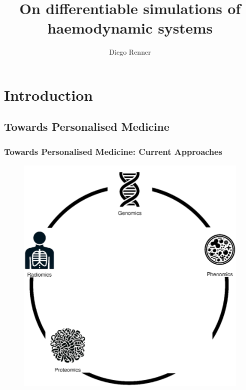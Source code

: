 \documentclass[compress]{beamer}
\title{On differentiable simulations of \\ haemodynamic systems}
\author{Diego Renner}
\begin{document}
\section{Introduction}
\subsection{Towards Personalised Medicine}
\maketitle
\begin{frame}
	\frametitle{Towards Personalised Medicine: Current Approaches}
	\begin{minipage}{0.59\textwidth}
		\begin{figure}[H]
			\includegraphics[width=\textwidth]{images/approaches_current.eps}
		\end{figure}
	\end{minipage} 
	\begin{minipage}{0.39\textwidth}
		\begin{minipage}[t][0.82\paperheight][t]{\textwidth}

		\end{minipage}
	\end{minipage}
\end{frame}
\end{document}
